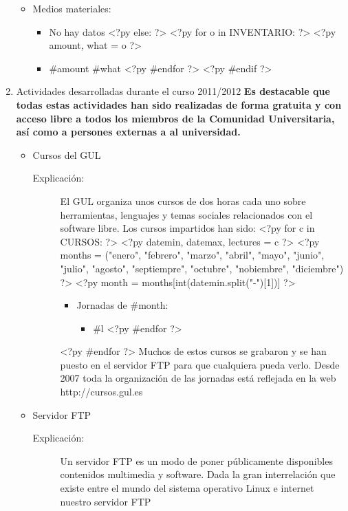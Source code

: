 \documentclass[a4paper,12pt]{report}
\begin{document}
\begin{enumerate}
\begin{itemize}
\item{Medios materiales:}
\begin{itemize}
<?py if len(INVENTARIO) == 0: ?>
\item No hay datos
<?py else: ?>
<?py     for o in INVENTARIO: ?>
<?py         amount, what = o ?>
\item{} #{amount} #{what}
<?py     #endfor ?>
<?py #endif ?>
\end{itemize}
\end{itemize}
\newpage
\item \textsf{\Large Actividades desarrolladas durante el curso 2011/2012}
\newline
\newline
\textbf{Es destacable que todas estas actividades han sido realizadas de forma
gratuita y con acceso libre a todos los miembros de la Comunidad Universitaria, así como a persones externas a al universidad.}
\begin{itemize}
\item Cursos del GUL
\begin{description}
\item[Explicación:] El GUL organiza
unos cursos de dos horas cada uno sobre herramientas, lenguajes y temas
sociales relacionados con el software libre. Los cursos impartidos han sido:
<?py for c in CURSOS: ?>
<?py     datemin, datemax, lectures = c ?>
<?py     months = ("enero", "febrero", "marzo", "abril", "mayo", "junio", "julio", "agosto", "septiempre", "octubre", "nobiembre", "diciembre") ?>
<?py     month = months[int(datemin.split("-")[1])] ?>
\begin{itemize}
\item Jornadas de #{month}:
\begin{itemize}
<?py     for l in lectures: ?>
\item #{l}
<?py #endfor ?>
\end{itemize}
\end{itemize}
<?py #endfor ?>
Muchos de estos cursos se grabaron y se han puesto en el servidor FTP para que cualquiera pueda verlo.
Desde 2007 toda la organización de las jornadas está reflejada en la web http://cursos.gul.es
\end{description}
\item Servidor FTP
\begin{description}
\item[Explicación:] 
Un servidor FTP es un modo de poner públicamente disponibles contenidos multimedia y software.
Dada la gran interrelación que existe entre el
mundo del sistema operativo Linux e internet nuestro servidor FTP

\end{description}
\end{itemize}
\end{enumerate}
\end{document}
